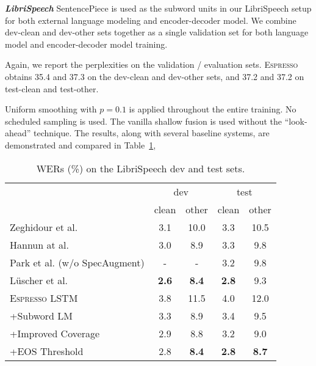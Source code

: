 \documentclass{article}
\def\espresso{\textsc{Espresso}\xspace}
\begin{document}
\vspace{0.2cm}
\noindent \textbf{\textit{LibriSpeech}}\quad
SentencePiece is used as the subword units in our LibriSpeech setup for both external language modeling and encoder-decoder model. We combine dev-clean and dev-other sets together as a single validation set for both language model and encoder-decoder model training.



Again, we report the perplexities on the validation / evaluation sets. \espresso obtains 35.4 and 37.3 on the dev-clean and dev-other sets, and 37.2 and 37.2 on test-clean and test-other.


Uniform smoothing with $p=0.1$ is applied throughout the entire training. No scheduled sampling is used. The vanilla shallow fusion is used without the ``look-ahead'' technique.  The results, along with several baseline systems, are demonstrated and compared in Table~\ref{tab:librispeech_lstm}, 

\begin{table}[tb]
  \caption{WERs (\%) on the LibriSpeech dev and test sets.}
  \label{tab:librispeech_lstm}
  \centering
  \setlength\tabcolsep{3pt}
  \begin{adjustbox}{max width=\linewidth}
  \begin{tabular}{l c c c c}
    \toprule
    
    & \multicolumn{2}{c}{dev} & \multicolumn{2}{c}{test} \\
    \cmidrule(lr){2-3} \cmidrule(lr){4-5}
    & clean &  other & clean & other \\
    \midrule
Zeghidour et al. \cite{zeghidour2018fully} & 3.1 & 10.0 & 3.3 & 10.5 \\
    Hannun at al. \cite{hannun2019sequence} & 3.0 & 8.9 & 3.3 & 9.8 \\
    Park et al. \cite{specaugment} (w/o SpecAugment) & - & - & 3.2 & 9.8 \\
L{\"{u}}scher et al. \cite{luscher2019hybrid} & \bf 2.6 & \bf 8.4 & \bf 2.8 & 9.3 \\
    \midrule
    \espresso LSTM & 3.8 & 11.5 & 4.0 & 12.0 \\
    \quad+Subword LM & 3.3 & 8.9 & 3.4 & 9.5 \\
    \quad\quad+Improved Coverage & 2.9 & 8.8 & 3.2 & 9.0 \\
    \quad\quad+EOS Threshold & 2.8 & \bf 8.4 & \bf 2.8 & \bf 8.7 \\
    \bottomrule
  \end{tabular}
  \end{adjustbox}
\end{table}
\end{document}
